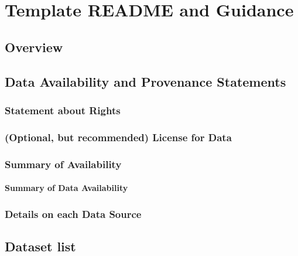 \documentclass[
]{article}
\author{}
\date{}
\begin{document}
\hypertarget{template-readme-and-guidance}{%
\section{Template README and
Guidance}\label{template-readme-and-guidance}}

\hypertarget{overview}{%
\subsection{Overview}\label{overview}}

\hypertarget{data-availability-and-provenance-statements}{%
\subsection{Data Availability and Provenance
Statements}\label{data-availability-and-provenance-statements}}

\hypertarget{statement-about-rights}{%
\subsubsection{Statement about Rights}\label{statement-about-rights}}

\hypertarget{optional-but-recommended-license-for-data}{%
\subsubsection{(Optional, but recommended) License for
Data}\label{optional-but-recommended-license-for-data}}

\hypertarget{summary-of-availability}{%
\subsubsection{Summary of Availability}\label{summary-of-availability}}

\hypertarget{summary-of-data-availability}{%
\paragraph{Summary of Data
Availability}\label{summary-of-data-availability}}

\hypertarget{details-on-each-data-source}{%
\subsubsection{Details on each Data
Source}\label{details-on-each-data-source}}

\hypertarget{dataset-list}{%
\subsection{Dataset list}\label{dataset-list}}
\end{document}
